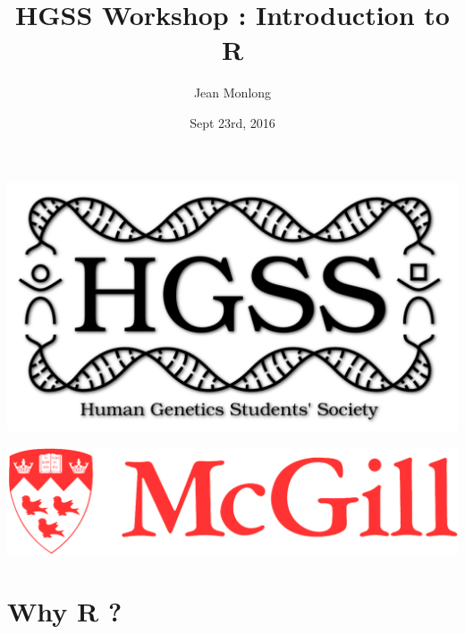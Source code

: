 \documentclass[10pt]{beamer}
\title{HGSS Workshop : Introduction to R}
\author{Jean Monlong}
\institute{Human Genetics department}
\date{Sept 23rd, 2016}
\begin{document}
\begin{frame}
  \centering
  \titlepage
  \begin{minipage}{.3\textwidth}
    \includegraphics[width=\linewidth]{../imgs/hgssLogo-black.png}
  \end{minipage}
  \hspace{.02\textwidth}
  \hspace{.02\textwidth}
  \begin{minipage}{.3\textwidth}
    \includegraphics[width=\linewidth]{../imgs/McGill-Logo1.png}
  \end{minipage}

\end{frame}




\section{Why R ?}
\end{document}
